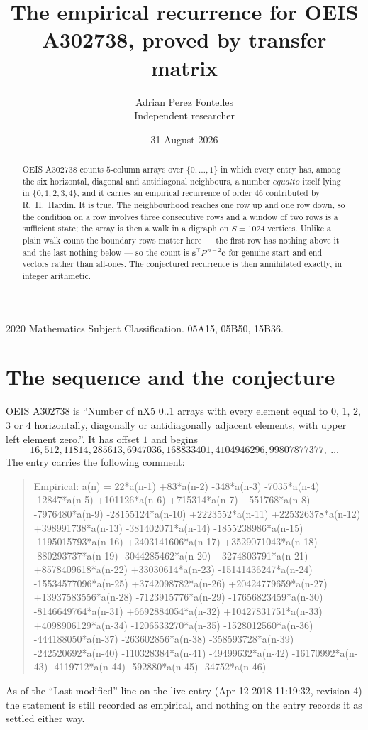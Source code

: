 \documentclass[11pt,a4paper]{article}
\title{The empirical recurrence for OEIS A302738, proved by transfer matrix}
\author{Adrian Perez Fontelles\\ \small Independent researcher}
\date{31 August 2026}
\theoremstyle{plain}
\theoremstyle{definition}
\begin{document}
\maketitle

\begin{abstract}
OEIS A302738 counts $5$-column arrays over $\{0,\dots,1\}$ in which every entry has,
among the six horizontal, diagonal and antidiagonal neighbours, a number $equal to$ itself lying in $\{0,1,2,3,4\}$, and it carries an empirical
recurrence of order $46$ contributed by R.~H.~Hardin. It is true. The neighbourhood
reaches one row up and one row down, so the condition on a row involves three consecutive
rows and a window of two rows is a sufficient state; the array is then a walk in a digraph
on $S=1024$ vertices. Unlike a plain walk count the boundary rows matter here --- the first
row has nothing above it and the last nothing below --- so the count is
$\mathbf{s}^{\!\top}P^{\,n-2}\mathbf{e}$ for genuine start and end vectors rather than
all-ones. The conjectured recurrence is then annihilated exactly, in integer arithmetic.
\end{abstract}

\noindent\small 2020 Mathematics Subject Classification. 05A15, 05B50, 15B36.\normalsize

\section{The sequence and the conjecture}

OEIS A302738 is ``Number of nX5 0..1 arrays with every element equal to 0, 1, 2, 3 or 4 horizontally, diagonally or antidiagonally adjacent elements, with upper left element zero.''. It has offset
$1$ and begins
\[
16, 512, 11814, 285613, 6947036, 168833401, 4104946296, 99807877377,\ \dots
\]
The entry carries the following comment:
\begin{quote}\small
Empirical: a(n) = 22*a(n-1) +83*a(n-2) -348*a(n-3) -7035*a(n-4) -12847*a(n-5) +101126*a(n-6) +715314*a(n-7) +551768*a(n-8) -7976480*a(n-9) -28155124*a(n-10) +2223552*a(n-11) +225326378*a(n-12) +398991738*a(n-13) -381402071*a(n-14) -1855238986*a(n-15) -1195015793*a(n-16) +2403141606*a(n-17) +3529071043*a(n-18) -880293737*a(n-19) -3044285462*a(n-20) +3274803791*a(n-21) +8578409618*a(n-22) +33030614*a(n-23) -15141436247*a(n-24) -15534577096*a(n-25) +3742098782*a(n-26) +20424779659*a(n-27) +13937583556*a(n-28) -7123915776*a(n-29) -17656823459*a(n-30) -8146649764*a(n-31) +6692884054*a(n-32) +10427831751*a(n-33) +4098906129*a(n-34) -1206533270*a(n-35) -1528012560*a(n-36) -444188050*a(n-37) -263602856*a(n-38) -358593728*a(n-39) -242520692*a(n-40) -110328384*a(n-41) -49499632*a(n-42) -16170992*a(n-43) -4119712*a(n-44) -592880*a(n-45) -34752*a(n-46)
\end{quote}
As of the ``Last modified'' line on the live entry (Apr 12 2018 11:19:32, revision
4) the statement is still recorded as empirical, and nothing on the entry
records it as settled either way.
\end{document}
